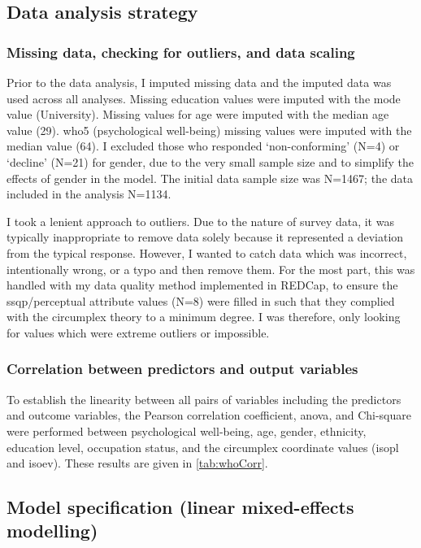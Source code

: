 \subsection{Data analysis strategy}

\subsubsection*{Missing data, checking for outliers, and data scaling}

Prior to the data analysis, I imputed missing data and the imputed data was used across all analyses. Missing education values were imputed with the mode value (University). Missing values for age were imputed with the median age value (29). \gls{who5} (psychological well-being) missing values were imputed with the median value (64). I excluded those who responded `non-conforming' (N=4) or `decline' (N=21) for gender, due to the very small sample size and to simplify the effects of gender in the model. The initial data sample size was N=1467; the data included in the analysis N=1134.

I took a lenient approach to outliers. Due to the nature of survey data, it was typically inappropriate to remove data solely because it represented a deviation from the typical response. However, I wanted to catch data which was incorrect, intentionally wrong, or a typo and then remove them. For the most part, this was handled with my data quality method implemented in REDCap, to ensure the \gls{ssqp}/perceptual attribute values (N=8) were filled in such that they complied with the circumplex theory to a minimum degree. I was therefore, only looking for values which were extreme outliers or impossible.

\subsubsection*{Correlation between predictors and output variables}
To establish the linearity between all pairs of variables including the predictors and outcome variables, the Pearson correlation coefficient, \gls{anova}, and Chi-square were performed between psychological well-being, age, gender, ethnicity, education level, occupation status, and the circumplex coordinate values (\gls{isopl} and \gls{isoev}). These results are given in \cref{tab:whoCorr}.

\subsection{Model specification (linear mixed-effects modelling)}

